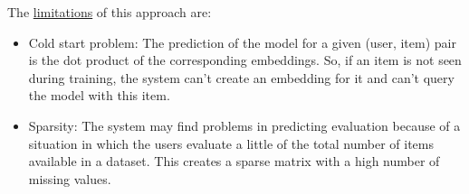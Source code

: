 \documentclass{article}
\begin{document}
\begin{itemize}
\begin{itemize}
      \end{itemize}
      The \underline{limitations} of this approach are:
      \begin{itemize}
            \item Cold start problem: The prediction of the model for a given (user, item) pair is the dot product of the corresponding embeddings. So, if an item is not seen during training, the system can't create an embedding for it and can't query the model with this item.
            \item Sparsity: The system may find problems in predicting evaluation because of a situation in which the users evaluate a little of the total number of items available in a dataset. This creates a sparse matrix with a high number of missing values.
      \end{itemize}


\end{itemize}
\end{document}
